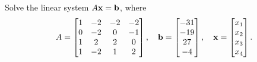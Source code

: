 \question Solve the linear system $A\bm{\mathrm{x}}=\bm{\mathrm{b}}$, where
\[
    A = \begin{bmatrix}
        1 & -2 & -2 & -2 \\
        0 & -2 & 0 & -1 \\
        1 & 2 & 2 & 0 \\
        1 & -2 & 1 & 2
    \end{bmatrix},
    \quad
    \bm{\mathrm{b}} = \begin{bmatrix}
        -31 \\ -19 \\ 27 \\ -4
    \end{bmatrix},
    \quad
    \bm{\mathrm{x}} = \begin{bmatrix}
        x_1 \\ x_2 \\ x_3 \\ x_4
    \end{bmatrix}.
\]

